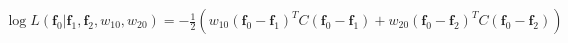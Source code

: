 \documentclass[10pt]{article}
\begin{document}
\begin{align*}\log L(\boldsymbol{f}_0|\boldsymbol{f}_1,\boldsymbol{f}_2, w_{10},w_{20}) = -\frac{1}{2}\left(w_{10}(\boldsymbol{f}_0-\boldsymbol{f}_1)^TC(\boldsymbol{f}_0-\boldsymbol{f}_1)+w_{20}(\boldsymbol{f}_0-\boldsymbol{f}_2)^TC(\boldsymbol{f}_0-\boldsymbol{f}_2)\right)\end{align*}
\end{document}
